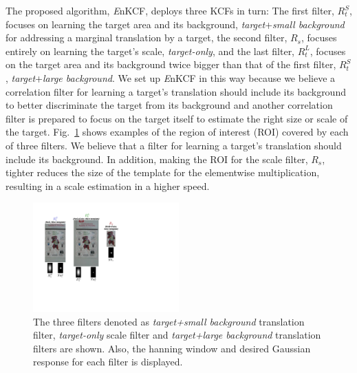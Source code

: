 \documentclass{bmvc2k}
\begin{document}
The proposed algorithm, {\it E}nKCF, deploys three KCFs in turn: The
first filter, $R_{t}^{S}$, focuses on learning the target area and its
background, \textit{target}+\textit{small background} for addressing a
marginal translation by a target, the second filter, $R_{s}$, focuses
entirely on learning the target's scale, \textit{target-only}, and the
last filter, $R_{t}^{L}$, focuses on the target area and its
background twice bigger than that of the first filter, $R_{t}^{S}$,
\textit{target}+\textit{large background}. We set up {\it E}nKCF in
this way because we believe a correlation filter for learning a
target's translation should include its background to better
discriminate the target from its background and another correlation
filter is prepared to focus on the target itself to estimate the right
size or scale of the target. Fig.~\ref{fig:Filters} shows examples
of the region of interest (ROI) covered by each of three filters. We
believe that a filter for learning a target's translation should
include its background. In addition, making the ROI for the scale
filter, $R_{s}$, tighter reduces the size of the template for the
elementwise multiplication, resulting in a scale estimation in a
higher speed.
\begin{figure}[!h]
\centering
\includegraphics[width=0.5\textwidth]{figures/Filters_Details.pdf}
\caption{The three filters denoted as \textit{target+small background} translation filter,
  \textit{target-only} scale filter and \textit{target+large background} translation filters are
  shown. Also, the hanning window and desired Gaussian response for
  each filter is displayed.}
\label{fig:Filters}
\end{figure}
\end{document}
